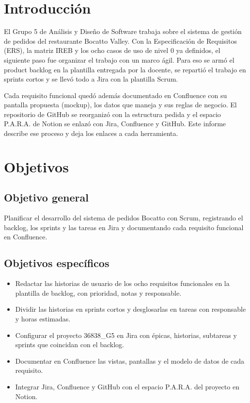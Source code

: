\documentclass[a4paper, 11pt]{article}
\begin{document}
\textbf{}
\newpage
\thispagestyle{empty}

\tableofcontents
\newpage

\section{Introducción}

El Grupo 5 de Análisis y Diseño de Software trabaja sobre el sistema de gestión de pedidos del restaurante Bocatto Valley. Con la Especificación de Requisitos (ERS), la matriz IREB y los ocho casos de uso de nivel 0 ya definidos, el siguiente paso fue organizar el trabajo con un marco ágil. Para eso se armó el product backlog en la plantilla entregada por la docente, se repartió el trabajo en sprints cortos y se llevó todo a Jira con la plantilla Scrum.

Cada requisito funcional quedó además documentado en Confluence con su pantalla propuesta (mockup), los datos que maneja y sus reglas de negocio. El repositorio de GitHub se reorganizó con la estructura pedida y el espacio P.A.R.A. de Notion se enlazó con Jira, Confluence y GitHub. Este informe describe ese proceso y deja los enlaces a cada herramienta.

\section{Objetivos}

\subsection{Objetivo general}

Planificar el desarrollo del sistema de pedidos Bocatto con Scrum, registrando el backlog, los sprints y las tareas en Jira y documentando cada requisito funcional en Confluence.

\subsection{Objetivos específicos}

\begin{itemize}
  \item Redactar las historias de usuario de los ocho requisitos funcionales en la plantilla de backlog, con prioridad, notas y responsable.
  \item Dividir las historias en sprints cortos y desglosarlas en tareas con responsable y horas estimadas.
  \item Configurar el proyecto 36838\_G5 en Jira con épicas, historias, subtareas y sprints que coincidan con el backlog.
  \item Documentar en Confluence las vistas, pantallas y el modelo de datos de cada requisito.
  \item Integrar Jira, Confluence y GitHub con el espacio P.A.R.A. del proyecto en Notion.
\end{itemize}
\end{document}

